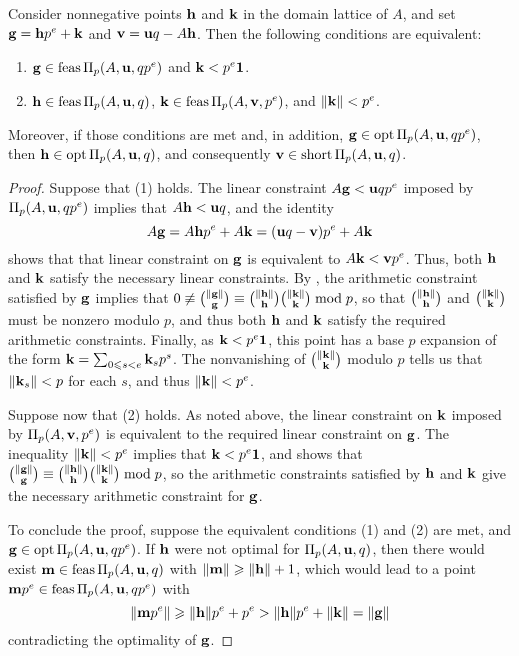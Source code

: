 \documentclass{amsart}
\begin{document}
\begin{lemma}
   \label{general AIP prep: L}
   Consider nonnegative points $\mathbf{h}$ and $\mathbf{k}$ in the domain lattice of $A$, and set $\mathbf{g} = \mathbf{h} p^e + \mathbf{k}$ and $\mathbf{v} = \mathbf{u}q - A\mathbf{h}$.
   Then the following conditions are equivalent\textup:
   \begin{enumerate}[$(1)$]
      \item $\mathbf{g} \in \operatorname{feas} \Pi_p(A,\mathbf{u},qp^e)$ and $\mathbf{k} < p^e \mathbf{1}$.
      \item $\mathbf{h} \in \operatorname{feas} \Pi_p(A,\mathbf{u},q)$, $\mathbf{k} \in \operatorname{feas} \Pi_p(A,\mathbf{v},p^e)$, and $\| \mathbf{k} \| < p^e$.
   \end{enumerate}
   Moreover, if those conditions are met and, in addition, $\mathbf{g}\in \operatorname{opt} \Pi_p(A,\mathbf{u},qp^e)$, then $\mathbf{h} \in \operatorname{opt} \Pi_p(A,\mathbf{u},q)$, and consequently $\mathbf{v} \in \operatorname{short} \Pi_p(A,\mathbf{u},q)$.
\end{lemma}

\begin{proof}
   Suppose that (1) holds.
   The linear constraint $A\mathbf{g} < \mathbf{u}qp^e$ imposed by $\Pi_p(A, \mathbf{u}, qp^e)$ implies that $A\mathbf{h} < \mathbf{u}q$, and the identity
   \[A \mathbf{g} = A \mathbf{h} p^e + A \mathbf{k} = (\mathbf{u}q-\mathbf{v})p^e + A \mathbf{k}\]
   shows that that linear constraint on $\mathbf{g}$ is equivalent to $A \mathbf{k} < \mathbf{v}p^e$.
   Thus, both $\mathbf{h}$ and $\mathbf{k}$ satisfy the necessary linear constraints.
   By , the arithmetic constraint satisfied by $\mathbf{g}$ implies that $0 \not \equiv \binom{\| \mathbf{g} \|}{\mathbf{g}} \equiv \binom{\| \mathbf{h} \|}{\mathbf{h}} \binom{\| \mathbf{k} \|}{\mathbf{k}} \bmod p$, so that $\binom{\| \mathbf{h} \|}{\mathbf{h}}$ and $\binom{\| \mathbf{k} \|}{\mathbf{k}}$ must be nonzero modulo $p$, and thus both $\mathbf{h}$ and $\mathbf{k}$ satisfy the required arithmetic constraints.
   Finally, as $\mathbf{k} < p^e\mathbf{1}$, this point has a base $p$ expansion of the form $\mathbf{k} = \sum_{0 \leqslant s< e} \mathbf{k}_s  p^s$.
   The nonvanishing of $\binom{\| \mathbf{k} \|}{\mathbf{k}}$ modulo $p$ tells us that $\| \mathbf{k}_s \| < p$ for each $s$, and thus $\| \mathbf{k} \| < p^e$.
   
   Suppose now that (2) holds.
   As noted above, the linear constraint on $\mathbf{k}$ imposed by $\Pi_p(A,\mathbf{v},p^e)$ is equivalent to the required linear constraint on $\mathbf{g}$.
   The inequality $\| \mathbf{k} \| < p^e$ implies that $\mathbf{k} < p^e \mathbf{1}$, and  shows that $\binom{\| \mathbf{g} \|}{\mathbf{g}} \equiv  \binom{\| \mathbf{h} \|}{\mathbf{h}} \binom{\| \mathbf{k} \|}{\mathbf{k}} \bmod p$, so the arithmetic constraints satisfied by $\mathbf{h}$ and $\mathbf{k}$ give the necessary arithmetic constraint for $\mathbf{g}$.

   To conclude the proof, suppose the equivalent conditions (1) and (2) are met, and $\mathbf{g} \in \operatorname{opt} \Pi_p(A,\mathbf{u},qp^e)$.
   If $\mathbf{h}$ were not optimal for $\Pi_p(A, \mathbf{u}, q)$, then there would exist $\mathbf{m} \in \operatorname{feas}\Pi_p(A, \mathbf{u}, q)$ with $\| \mathbf{m} \| \geqslant \| \mathbf{h} \| + 1$, which would lead to a point $\mathbf{m}p^e \in \operatorname{feas}\Pi_p(A, \mathbf{u}, qp^e)$ with
   \[ \| \mathbf{m}p^e \| \geqslant \| \mathbf{h} \|  p^e + p^e >  \| \mathbf{h} \|  p^e + \| \mathbf{k} \| = \| \mathbf{g} \|\]
   contradicting the optimality of $\mathbf{g}$.
\end{proof}
\end{document}
